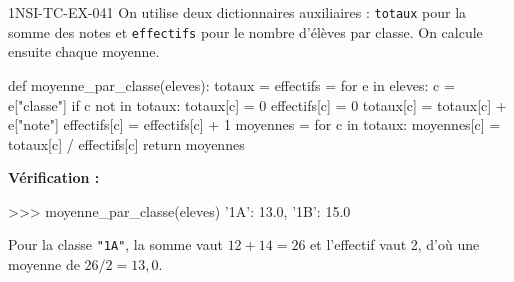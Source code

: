 \begin{corrige}{1NSI-TC-EX-041}
On utilise deux dictionnaires auxiliaires : \lstinline{totaux} pour la somme des notes et \lstinline{effectifs} pour le nombre d'élèves par classe. On calcule ensuite chaque moyenne.

\begin{python}
def moyenne_par_classe(eleves):
    totaux = {}
    effectifs = {}
    for e in eleves:
        c = e["classe"]
        if c not in totaux:
            totaux[c] = 0
            effectifs[c] = 0
        totaux[c] = totaux[c] + e["note"]
        effectifs[c] = effectifs[c] + 1
    moyennes = {}
    for c in totaux:
        moyennes[c] = totaux[c] / effectifs[c]
    return moyennes
\end{python}

\textbf{Vérification :}
\begin{console}
>>> moyenne_par_classe(eleves)
{'1A': 13.0, '1B': 15.0}
\end{console}

Pour la classe \lstinline{"1A"}, la somme vaut $12 + 14 = 26$ et l'effectif vaut 2, d'où une moyenne de $26 / 2 = 13{,}0$.
\end{corrige}
